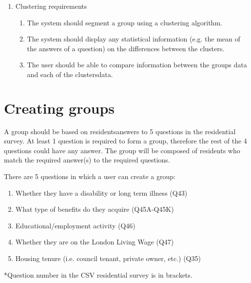 \begin{enumerate}
\begin{enumerate}
		\item 1.	The main data used in the visualizations should be the CSV of Lambeth\textquotesingle s Residential Survey and its Code Translation.
	\end{enumerate}
	\item Clustering requirements
	\begin{enumerate}
		\item The system should segment a group using a clustering algorithm.
		\item The system should display any statistical information (e.g. the mean of the answers of a question) on the differences between the clusters.
		\item The user should be able to compare information between the group\textquotesingle s data and each of the clusters\textquotesingle  data.
	\end{enumerate}
\end{enumerate}


\section{Creating groups} \label{creating_groups}
A group should be based on residents\textquotesingle  answers to 5 questions in the residential survey. At least 1 question is required to form a group, therefore the rest of the 4 questions could have any answer. The group will be composed of residents who match the required answer(s) to the required questions.\par

There are 5 questions in which a user can create a group:

\begin{enumerate}
	\item Whether they have a disability or long term illness (Q43)

	\item What type of benefits do they acquire (Q45A-Q45K)
	\item Educational/employment activity (Q46)
	\item Whether they are on the London Living Wage (Q47)
	\item Housing tenure (i.e. council tenant, private owner, etc.) (Q35)
\end{enumerate}

*Question number in the CSV residential survey is in brackets.


